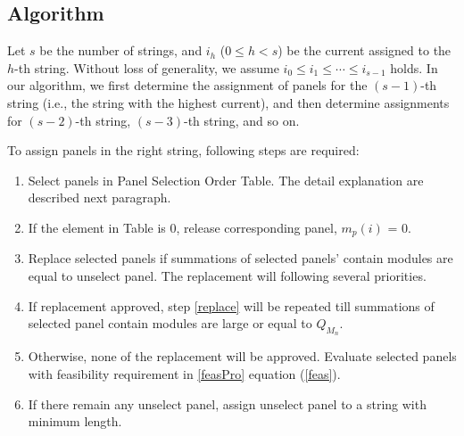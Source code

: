 \documentclass[conference]{IEEEtran}
\begin{document}
\subsection{Algorithm} \label{selection strategy}
Let $s$ be the number of strings, and $i_h$ ($0\le h<s$) be the current assigned to the $h$-th string. Without loss of generality, we assume $i_0\le i_1\le \cdots \le i_{s-1}$ holds. In our algorithm, we first determine the assignment of panels for the $(s-1)$-th string (i.e., the string with the highest current), and then determine assignments for $(s-2)$-th string, $(s-3)$-th string, and so on.

To assign panels in the right string, following steps are required:
\begin{enumerate} [(1)]
\item Select panels in Panel Selection Order Table. The detail explanation are described next paragraph.\label{step1}
\item If the element in Table is 0, release corresponding panel, $m_p(i)$ = 0.
\item Replace selected panels if summations of selected panels' contain modules are equal to unselect panel. The replacement will following several priorities.
  \label{replace}
\item If replacement approved, step \ref{replace} will be repeated till summations of selected panel contain modules are large or equal to \textit{$Q_{M_n}$}.
\item Otherwise, none of the replacement will be approved. Evaluate selected panels with feasibility requirement in \ref{feasPro} equation (\ref{feas}).
\item If there remain any unselect panel, assign unselect panel to a string with minimum length. 
\end{enumerate}
\end{document}
